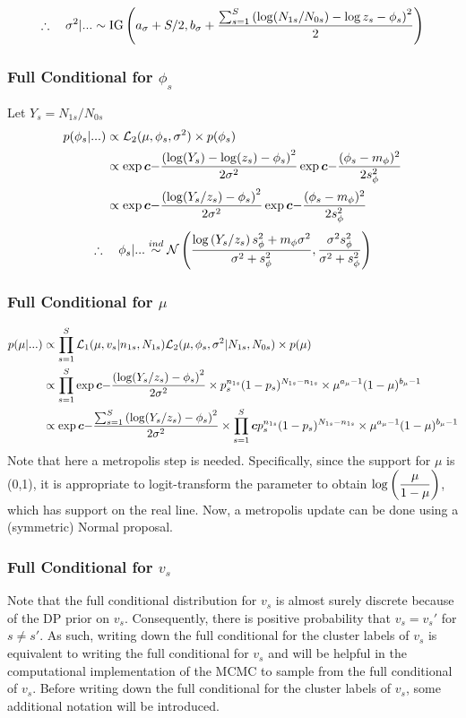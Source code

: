 \documentclass[12pt]{article}
\newcommand{\bc}{\mbox{\boldmath $c$}}
\begin{document}
$$
\therefore ~~~ \sigma^2|... \sim \text{IG}\left(a_\sigma+S/2, b_\sigma+\frac{\sum_{s=1}^S\left(\log(N_{1s}/N_{0s})-\log z_s-\phi_s\right)^2}{2}\right)
$$

\subsubsection{Full Conditional for $\phi_s$}
Let $Y_s = N_{1s}/N_{0s}$
\begin{align*}
  p(\phi_s|...) &\propto\L_2(\mu,\phi_s,\sigma^2) \times p(\phi_s)\\
                &\propto\exp\bc{-\frac{\p{\log(Y_s)-\log(z_s)-\phi_s}^2}{2\sigma^2}}
  \exp\bc{-\frac{(\phi_s-m_\phi)^2}{2s_\phi^2}}\\
                &\propto\exp\bc{-\frac{\p{\log(Y_s/z_s)-\phi_s}^2}{2\sigma^2}} 
  \exp\bc{-\frac{(\phi_s-m_\phi)^2}{2s_\phi^2}}\\
\end{align*}
$$
\therefore ~~~ \phi_s | ... \overset{ind}{\sim}  \mathcal N\left(\frac{\log\left(Y_s/z_s\right)s_\phi^2+m_\phi\sigma^2}{\sigma^2+s_\phi^2},\frac{\sigma^2 s_\phi^2}{\sigma^2+s_\phi^2}\right)
$$

\subsubsection{Full Conditional for $\mu$}
\begin{align*}
  p(\mu|...) &\propto \prods \L_1(\mu,v_s|n_{1s},N_{1s})\L_2(\mu,\phi_s,\sigma^2|N_{1s},N_{0s}) \times p(\mu) \\
             &\propto \prods \exp\bc{-\frac{\p{\log(Y_s/z_s)-\phi_s}^2}{2\sigma^2}} \times p_s^{n_{1s}} (1-p_s)^{N_{1s}-n_{1s}} \times \mu^{a_\mu-1} (1-\mu)^{b_\mu-1}\\
             &\propto \exp\bc{-\frac{\sums\p{\log(Y_s/z_s)-\phi_s}^2}{2\sigma^2}} \times \prods\bc{p_s^{n_{1s}} (1-p_s)^{N_{1s}-n_{1s}}} \times \mu^{a_\mu-1} (1-\mu)^{b_\mu-1}\\
\end{align*}
Note that here a metropolis step is needed. Specifically, since the support for
$\mu$ is (0,1), it is appropriate to logit-transform the parameter to obtain
$\log\left(\displaystyle\frac{\mu}{1-\mu}\right)$, which has support on the real line. Now, a
metropolis update can be done using a (symmetric) Normal proposal.

\subsubsection{Full Conditional for $v_s$}
Note that the full conditional distribution for $v_s$ is almost surely discrete because of the DP prior on $v_s$. 
Consequently, there is positive probability that $v_s=v_s'$ for $s\ne s'$. As such, writing down the full conditional for
the cluster labels of $v_s$ is equivalent to writing the full conditional for $v_s$ and will be helpful in the computational
implementation of the MCMC to sample from the full conditional of $v_s$. Before writing down the full conditional for the
cluster labels of $v_s$, some additional notation will be introduced.
\end{document}
